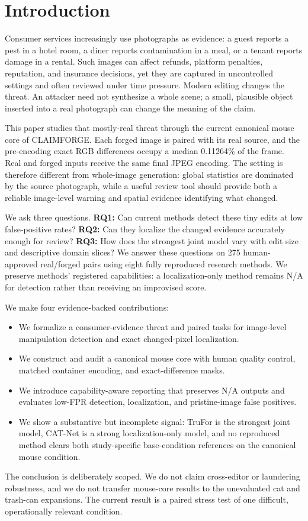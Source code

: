 \section{Introduction}

Consumer services increasingly use photographs as evidence: a guest reports a pest in a hotel room, a diner reports contamination in a meal, or a tenant reports damage in a rental. Such images can affect refunds, platform penalties, reputation, and insurance decisions, yet they are captured in uncontrolled settings and often reviewed under time pressure. Modern editing changes the threat. An attacker need not synthesize a whole scene; a small, plausible object inserted into a real photograph can change the meaning of the claim.

This paper studies that mostly-real threat through the current canonical mouse core of CLAIMFORGE. Each forged image is paired with its real source, and the pre-encoding exact RGB differences occupy a median 0.11264\% of the frame. Real and forged inputs receive the same final JPEG encoding. The setting is therefore different from whole-image generation: global statistics are dominated by the source photograph, while a useful review tool should provide both a reliable image-level warning and spatial evidence identifying what changed.

We ask three questions. \textbf{RQ1:} Can current methods detect these tiny edits at low false-positive rates? \textbf{RQ2:} Can they localize the changed evidence accurately enough for review? \textbf{RQ3:} How does the strongest joint model vary with edit size and descriptive domain slices? We answer these questions on 275 human-approved real/forged pairs using eight fully reproduced research methods. We preserve methods' registered capabilities: a localization-only method remains N/A for detection rather than receiving an improvised score.

We make four evidence-backed contributions:
\begin{itemize}
    \item We formalize a consumer-evidence threat and paired tasks for image-level manipulation detection and exact changed-pixel localization.
    \item We construct and audit a canonical mouse core with human quality control, matched container encoding, and exact-difference masks.
    \item We introduce capability-aware reporting that preserves N/A outputs and evaluates low-FPR detection, localization, and pristine-image false positives.
    \item We show a substantive but incomplete signal: TruFor is the strongest joint model, CAT-Net is a strong localization-only model, and no reproduced method clears both study-specific base-condition references on the canonical mouse condition.
\end{itemize}

The conclusion is deliberately scoped. We do not claim cross-editor or laundering robustness, and we do not transfer mouse-core results to the unevaluated cat and trash-can expansions. The current result is a paired stress test of one difficult, operationally relevant condition.
